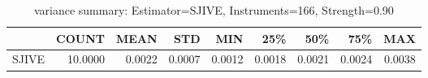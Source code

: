 \begin{table}[ht]
\centering
\caption{variance summary: Estimator=SJIVE, Instruments=166, Strength=0.90}
\begin{tabular}{lrrrrrrrr}
\toprule
 & COUNT & MEAN & STD & MIN & 25\% & 50\% & 75\% & MAX \\
\midrule
SJIVE & 10.0000 & 0.0022 & 0.0007 & 0.0012 & 0.0018 & 0.0021 & 0.0024 & 0.0038 \\
\bottomrule
\end{tabular}
\end{table}
